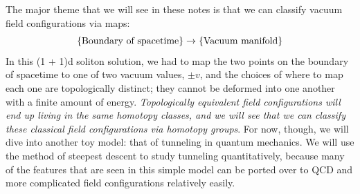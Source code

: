 \documentclass[11pt, oneside]{article}   	%
\theoremstyle{definition}
\begin{document}
The major theme that we will see in these notes is that we can classify vacuum field configurations via maps:
\begin{equation}
	\left\{\textnormal{Boundary of spacetime}\right\}\rightarrow \left\{\textnormal{Vacuum manifold}\right\}
\end{equation}
In this (1 + 1)d soliton solution, we had to map the two points on the boundary of spacetime to one of two vacuum values, $\pm v$, and 
the choices of where to map each one are topologically distinct; they cannot be deformed into one another with a finite amount of energy. 
\textit{Topologically equivalent field configurations will end up living in the same homotopy classes, and we will see that we can classify these 
classical field configurations via homotopy groups}. For now, though, we will dive into another toy model: that of tunneling in quantum 
mechanics. We will use the method of steepest descent to study tunneling quantitatively, because many of the features that are seen 
in this simple model can be ported over to QCD and more complicated field configurations relatively easily. 
\end{document}
